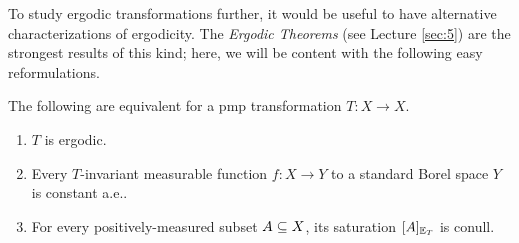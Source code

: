 \documentclass[reqno, twoside]{article}
\begin{document}
    To study ergodic transformations further, it would be useful to have alternative characterizations of ergodicity. The \textit{Ergodic Theorems} (see Lecture \ref{sec:5}) are the strongest results of this kind; here, we will be content with the following easy reformulations.

    \begin{theorem}
        The following are equivalent for a pmp transformation $T:X\to X$.
        \begin{enumerate}
            \item $T$ is ergodic.
                \vspace{-0.05in}
            \item Every $T$-invariant measurable function $f:X\to Y$ to a standard Borel space $Y$ is constant a.e..
                \vspace{-0.05in}
            \item For every positively-measured subset $A\subseteq X$, its saturation $[A]_{\mathbb{E}_T}$ is conull.
        \end{enumerate}
    \end{theorem}
\end{document}

